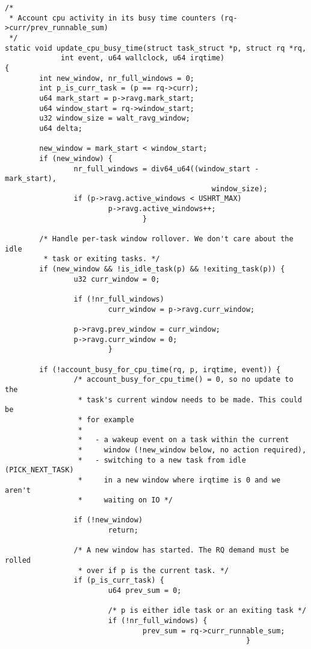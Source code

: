 \documentclass{article}
\begin{document}
\begin{verbatim}
/*
 * Account cpu activity in its busy time counters (rq->curr/prev_runnable_sum)
 */
static void update_cpu_busy_time(struct task_struct *p, struct rq *rq,
             int event, u64 wallclock, u64 irqtime)
{
        int new_window, nr_full_windows = 0;
        int p_is_curr_task = (p == rq->curr);
        u64 mark_start = p->ravg.mark_start;
        u64 window_start = rq->window_start;
        u32 window_size = walt_ravg_window;
        u64 delta;

        new_window = mark_start < window_start;
        if (new_window) {
                nr_full_windows = div64_u64((window_start - mark_start),
                                                window_size);
                if (p->ravg.active_windows < USHRT_MAX)
                        p->ravg.active_windows++;
                                }

        /* Handle per-task window rollover. We don't care about the idle
         * task or exiting tasks. */
        if (new_window && !is_idle_task(p) && !exiting_task(p)) {
                u32 curr_window = 0;

                if (!nr_full_windows)
                        curr_window = p->ravg.curr_window;

                p->ravg.prev_window = curr_window;
                p->ravg.curr_window = 0;
                        }

        if (!account_busy_for_cpu_time(rq, p, irqtime, event)) {
                /* account_busy_for_cpu_time() = 0, so no update to the
                 * task's current window needs to be made. This could be
                 * for example
                 *
                 *   - a wakeup event on a task within the current
                 *     window (!new_window below, no action required),
                 *   - switching to a new task from idle (PICK_NEXT_TASK)
                 *     in a new window where irqtime is 0 and we aren't
                 *     waiting on IO */
                 
                if (!new_window)
                        return;

                /* A new window has started. The RQ demand must be rolled
                 * over if p is the current task. */
                if (p_is_curr_task) {
                        u64 prev_sum = 0;

                        /* p is either idle task or an exiting task */
                        if (!nr_full_windows) {
                                prev_sum = rq->curr_runnable_sum;
                                                        }


\end{verbatim}
\end{document}
